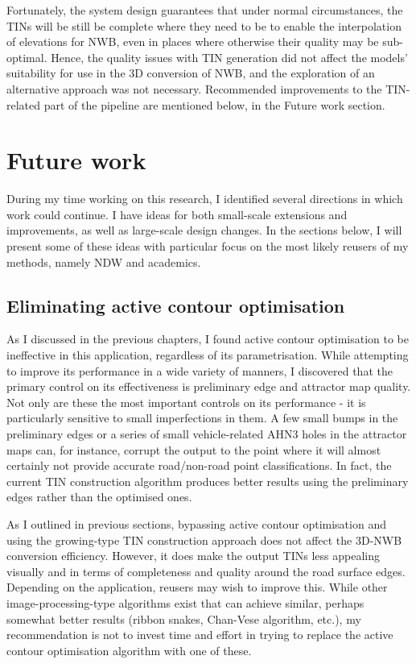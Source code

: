Fortunately, the system design guarantees that under normal circumstances, the TINs will be still be complete where they need to be to enable the interpolation of elevations for NWB, even in places where otherwise their quality may be sub-optimal. Hence, the quality issues with TIN generation did not affect the models' suitability for use in the 3D conversion of NWB, and the exploration of an alternative approach was not necessary. Recommended improvements to the TIN-related part of the pipeline are mentioned below, in the Future work section.

\section{Future work}
\label{sec:futurework}

During my time working on this research, I identified several directions in which work could continue. I have ideas for both small-scale extensions and improvements, as well as large-scale design changes. In the sections below, I will present some of these ideas with particular focus on the most likely reusers of my methods, namely NDW and academics.

\subsection{Eliminating active contour optimisation}
\label{sub:improvementsactivecontours}

As I discussed in the previous chapters, I found active contour optimisation to be ineffective in this application, regardless of its parametrisation. While attempting to improve its performance in a wide variety of manners, I discovered that the primary control on its effectiveness is preliminary edge and attractor map quality. Not only are these the most important controls on its performance - it is particularly sensitive to small imperfections in them. A few small bumps in the preliminary edges or a series of small vehicle-related AHN3 holes in the attractor maps can, for instance, corrupt the output to the point where it will almost certainly not provide accurate road/non-road point classifications. In fact, the current TIN construction algorithm produces better results using the preliminary edges rather than the optimised ones.

As I outlined in previous sections, bypassing active contour optimisation and using the growing-type TIN construction approach does not affect the 3D-NWB conversion efficiency. However, it does make the output TINs less appealing visually and in terms of completeness and quality around the road surface edges. Depending on the application, reusers may wish to improve this. While other image-processing-type algorithms exist that can achieve similar, perhaps somewhat better results (ribbon snakes, Chan-Vese algorithm, etc.), my recommendation is not to invest time and effort in trying to replace the active contour optimisation algorithm with one of these.

